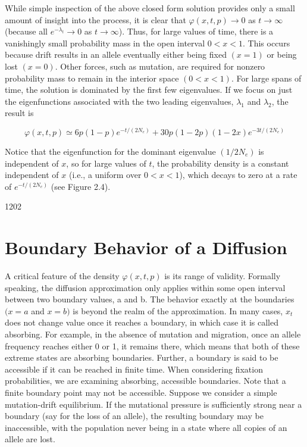\documentclass{article}
\begin{document}
While simple inspection of the above closed form solution provides only a small amount of insight into the process, it is clear that  $ \varphi(x, t, p) \to 0 $ as  $ t \to \infty $ (because all  $ e^{-\lambda_t} \to 0 $ as  $ t \to \infty $). Thus, for large values of time, there is a vanishingly small probability mass in the open interval  $ 0 < x < 1 $. This occurs because drift results in an allele eventually either being fixed  $ (x = 1) $ or being lost  $ (x = 0) $. Other forces, such as mutation, are required for nonzero probability mass to remain in the interior space  $ (0 < x < 1) $. For large spans of time, the solution is dominated by the first few eigenvalues. If we focus on just the eigenfunctions associated with the two leading eigenvalues,  $ \lambda_1 $ and  $ \lambda_2 $, the result is

\begin{equation}
\varphi(x,t,p)\simeq6p(1-p)e^{-t/(2N_{e})}+30p(1-2p)(1-2x)e^{-3t/(2N_{e})}
\end{equation}

Notice that the eigenfunction for the dominant eigenvalue  $ (1/2N_e) $ is independent of  $ x $, so for large values of  $ t $, the probability density is a constant independent of  $ x $ (i.e., a uniform over  $ 0 < x < 1 $), which decays to zero at a rate of  $ e^{-t/(2N_e)} $ (see Figure 2.4).

1202

\section{Boundary Behavior of a Diffusion}
A critical feature of the density  $ \varphi(x,t,p) $ is its range of validity. Formally speaking, the diffusion approximation only applies within some open interval between two boundary values, a and b. The behavior exactly at the boundaries  $ (x = a $ and  $ x = b) $ is beyond the realm of the approximation. In many cases,  $ x_t $ does not change value once it reaches a boundary, in which case it is called absorbing. For example, in the absence of mutation and migration, once an allele frequency reaches either 0 or 1, it remains there, which means that both of these extreme states are absorbing boundaries. Further, a boundary is said to be accessible if it can be reached in finite time. When considering fixation probabilities, we are examining absorbing, accessible boundaries. Note that a finite boundary point may not be accessible. Suppose we consider a simple mutation-drift equilibrium. If the mutational pressure is sufficiently strong near a boundary (say for the loss of an allele), the resulting boundary may be inaccessible, with the population never being in a state where all copies of an allele are lost.
\end{document}
